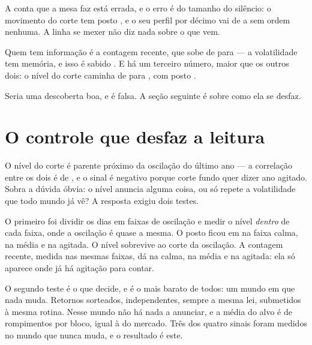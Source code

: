 A conta que a mesa faz está errada, e o erro é do tamanho do silêncio: o movimento do corte tem
posto \numEstabilidadeMovimentoPosto, e o seu perfil por décimo vai de
\numEstabilidadeMovimentoPrimeiroDecimo{} a \numEstabilidadeMovimentoUltimoDecimo{} sem ordem
nenhuma. A linha se mexer não diz nada sobre o que vem.

Quem tem informação é a contagem recente, que sobe de
\numEstabilidadeContagemPrimeiroDecimo{} para \numEstabilidadeContagemUltimoDecimo{} --- a
volatilidade tem memória, e isso é sabido \cite{engle1982autoregressive}. E há um terceiro número, maior que os outros dois: o
nível do corte caminha de \numEstabilidadeNivelPrimeiroDecimo{} para
\numEstabilidadeNivelUltimoDecimo, com posto \numEstabilidadeNivelPosto.

Seria uma descoberta boa, e é falsa. A seção seguinte é sobre como ela se desfaz.

\section{O controle que desfaz a leitura}

O nível do corte é parente próximo da oscilação do último ano --- a correlação entre os dois é
de \numEstabilidadeNivelComOscilacaoPosto, e o sinal é negativo porque corte fundo quer dizer
ano agitado. Sobra a dúvida óbvia: o nível anuncia alguma coisa, ou só repete a volatilidade que
todo mundo já vê? A resposta exigiu dois testes.

O primeiro foi dividir os dias em faixas de oscilação e medir o nível \emph{dentro} de cada
faixa, onde a oscilação é quase a mesma. O posto ficou em \numEstabilidadeFaixaBaixaNivelPosto{}
na faixa calma, \numEstabilidadeFaixaMediaNivelPosto{} na média e
\numEstabilidadeFaixaAltaNivelPosto{} na agitada. O nível sobrevive ao corte da oscilação. A contagem recente, medida nas mesmas faixas, dá
\numEstabilidadeFaixaBaixaContagemPosto{} na calma, \numEstabilidadeFaixaMediaContagemPosto{} na média e
\numEstabilidadeFaixaAltaContagemPosto{} na agitada: ela só aparece onde já há agitação para contar.

O segundo teste é o que decide, e é o mais barato de todos: um mundo em que nada muda. Retornos
sorteados, independentes, sempre a mesma lei, submetidos à mesma rotina. Nesse mundo não há nada
a anunciar, e a média do alvo é de \numEstabilidadeControleFuturoMedio{} rompimentos por bloco,
igual à do mercado. Três dos quatro sinais foram medidos no mundo que nunca muda, e o resultado é
este.

